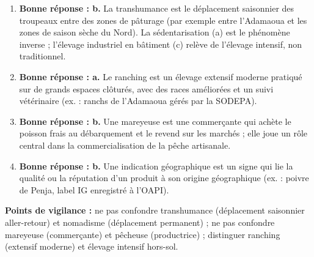 \documentclass[11pt]{article}
\newcommand{\cle}[1]{{\popxbold\color{popdark}#1}}
\begin{document}
\begin{corrige}
\begin{enumerate}
\item \textbf{Bonne réponse : b.} La transhumance est le \cle{déplacement saisonnier} des troupeaux entre des zones de pâturage (par exemple entre l'Adamaoua et les zones de saison sèche du Nord). La sédentarisation (a) est le phénomène inverse ; l'élevage industriel en bâtiment (c) relève de l'élevage intensif, non traditionnel.
\item \textbf{Bonne réponse : a.} Le \cle{ranching} est un élevage extensif moderne pratiqué sur de grands espaces clôturés, avec des races améliorées et un suivi vétérinaire (ex. : ranchs de l'Adamaoua gérés par la SODEPA).
\item \textbf{Bonne réponse : b.} Une \cle{mareyeuse} est une commerçante qui achète le poisson frais au débarquement et le revend sur les marchés ; elle joue un rôle central dans la commercialisation de la pêche artisanale.
\item \textbf{Bonne réponse : b.} Une \cle{indication géographique} est un signe qui lie la qualité ou la réputation d'un produit à son origine géographique (ex. : poivre de Penja, label IG enregistré à l'OAPI).
\end{enumerate}
\textbf{Points de vigilance :} ne pas confondre transhumance (déplacement saisonnier aller-retour) et nomadisme (déplacement permanent) ; ne pas confondre mareyeuse (commerçante) et pêcheuse (productrice) ; distinguer ranching (extensif moderne) et élevage intensif hors-sol.
\end{corrige}
\end{document}
